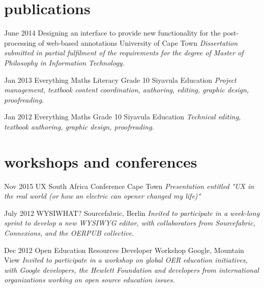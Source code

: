 \documentclass[]{friggeri-cv} %
\begin{document}
\section{publications}
\begin{entrylist}
\entry
{June 2014}
{Designing an interface to provide new
functionality for the post-processing of
web-based annotations}
{University of Cape Town}
{\emph{
Dissertation submitted in partial fulfilment of the requirements
for the degree of Master of Philosophy in Information Technology.} 
 }



\entry
{Jan 2013}
{Everything Maths Literacy Grade 10}
{Siyavula Education}
{\emph{Project management, textbook content coordination, authoring, editing, graphic design, proofreading.}}

\entry
{Jan 2012}
{Everything Maths Grade 10}
{Siyavula Education}
{\emph{Technical editing, textbook authoring, graphic design, proofreading.}}

\end{entrylist}


\section{workshops and conferences}

\begin{entrylist}
\entry
{Nov 2015}
{UX South Africa Conference}
{Cape Town}
{\emph{Presentation entitled "UX in the real world (or how an electric can opener changed my life)"}}

\entry
{July 2012}
{WYSIWHAT?}
{Sourcefabric, Berlin}
{\emph{Invited to participate in a week-long sprint to develop a new WYSIWYG editor, with collaborators from Sourcefabric, Connexions, and the OERPUB collective.}}

\entry
{Dec 2012}
{Open Education Resources Developer Workshop}
{Google, Mountain View}
{\emph{Invited to participate in a workshop on global OER education initiatives, with Google developers, the Hewlett Foundation and developers from international organizations working on open source education issues.}}

\end{entrylist}
\end{document}
